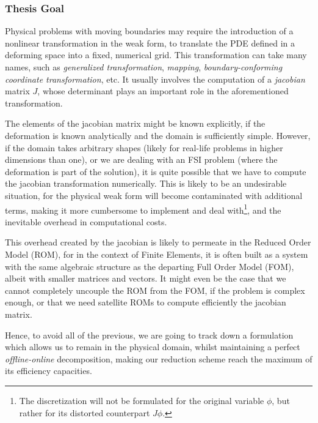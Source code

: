 \documentclass[thesis.tex]{subfiles}
\begin{document}
\subsubsection{Thesis Goal}
Physical problems with moving boundaries may require 
the introduction of a nonlinear transformation in the weak form,
to translate the PDE defined in a deforming space into a fixed, 
numerical grid.
This transformation can take many names, 
such as \textit{generalized transformation}, 
\textit{mapping},
\textit{boundary-conforming coordinate transformation},
etc.
It usually involves the computation of a \textit{jacobian} matrix $J$,
whose determinant plays an important role in the aforementioned transformation.

The elements of the jacobian matrix might be known explicitly,
if the deformation is known analytically and the domain is sufficiently simple.
However, if the domain takes arbitrary shapes 
(likely for real-life problems in higher dimensions than one),
or we are dealing with an FSI problem (where the deformation is part of the solution),
it is quite possible that we have to compute the jacobian transformation numerically.
This is likely to be an undesirable situation, 
for the physical weak form will become contaminated with additional terms, 
making it more cumbersome to implement and deal with\footnote{
    The discretization will not be formulated for the original variable $\phi$,
    but rather for its distorted counterpart $J \phi$.
    },
and the inevitable overhead in computational costs.

This overhead created by the jacobian is likely to permeate in the Reduced Order Model (ROM),
for in the context of Finite Elements, it is often built as a system with the same algebraic structure
as the departing Full Order Model (FOM),
albeit with smaller matrices and vectors. 
It might even be the case that we cannot completely uncouple the ROM from the FOM, 
if the problem is complex enough, or that we need satellite ROMs to compute efficiently the jacobian matrix.

Hence, to avoid all of the previous, 
we are going to track down a formulation which allows us to remain in the physical domain, 
whilst maintaining a perfect \textit{offline-online} decomposition,
making our reduction scheme reach the maximum of its efficiency capacities.
\end{document}
